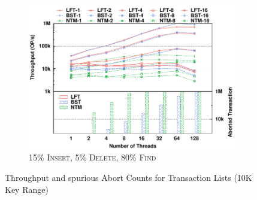\documentclass[]{sig-alternate-05-2015}
\begin{document}
\begin{figure}[p]
\begin{subfigure}{1\columnwidth}
        \includegraphics[width=1\columnwidth]{./data/amd15ins10kfilled.pdf}
        \vspace{-0.17in}
        \caption{15\% \textsc{Insert}, 5\% \textsc{Delete}, 80\% \textsc{Find}}
        \label{fig:txnlist15}
    \end{subfigure}
    \caption{Throughput and spurious Abort Counts for Transaction Lists (10K Key Range)}
    \label{fig:txnlist}
    \vspace{-0.2in}
\end{figure}
\end{document}
